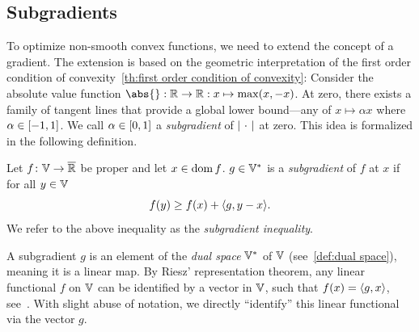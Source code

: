 \subsection{Subgradients}%
\label{ssec:subgradients}
To optimize non-smooth convex functions, we need to extend the concept of a gradient.
The extension is based on the geometric interpretation of the first order condition of convexity~\cref{th:first order condition of convexity}:
Consider the absolute value function \( \abs{} : \R \to \R : x \mapsto \max(x, -x) \).
At zero, there exists a family of tangent lines that provide a global lower bound---any of \( x \mapsto \alpha x \) where \( \alpha \in \interval{\num{-1}}{\num{1}} \).
We call \( \alpha \in \interval{\num{0}}{\num{1}} \) a \emph{subgradient} of  \( \lvert\,\,\cdot\,\,\rvert \) at zero.
This idea is formalized in the following definition.
\begin{definition}[Subgradient]%
	\label{def:subgradient}
	Let \( f \colon \mathbb{V} \to \overline{\mathbb{R}} \) be proper and let \( x \in \operatorname{dom} f \).
	\( g \in \mathbb{V}^{\ast} \) is a \emph{subgradient} of \( f \) at \( x \) if for all \( y \in \mathbb{V} \)
	\[
		f(y) \geq f(x) + \langle g, y - x \rangle.
	\]
	We refer to the above inequality as the \emph{subgradient inequality}.
\end{definition}
A subgradient \( g \) is an element of the \emph{dual space} \( \mathbb{V}^{\ast} \) of \( \mathbb{V} \) (see~\cref{def:dual space}), meaning it is a linear map.
By Riesz' representation theorem, any linear functional \( f \) on \( \mathbb{V} \) can be identified by a vector in \( \mathbb{V} \), such that \( f(x) = \langle g, x \rangle \), see~\cite[theorem 1.9]{Bachman1998-su}.
With slight abuse of notation, we directly \enquote{identify} this linear functional via the vector \( g \).

